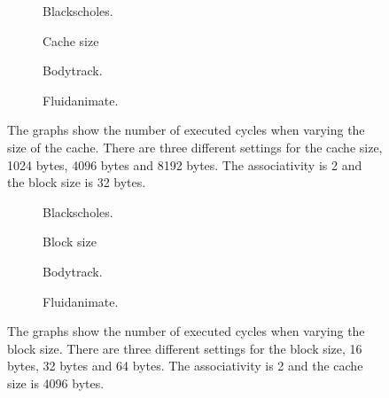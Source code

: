 \begin{figure}[H]
    \centering
    \begin{subfigure}[b]{0.33\textwidth}
        \centering
        \caption{Blackscholes.}\label{fig:cache_size_blackscholes_advanced}
    \end{subfigure}%
    \hfill
    \begin{subfigure}[b]{0.33\textwidth}
        \centering
        Cache size\par\medskip
        \caption{Bodytrack.}\label{fig:cache_size_bodytrack_advanced}
    \end{subfigure}%
    \hfill
    \begin{subfigure}[b]{0.33\textwidth}
        \centering
        \caption{Fluidanimate.}\label{fig:cache_size_fluidanimate_advanced}
    \end{subfigure}
    \hfill
    \caption{The graphs show the number of executed cycles when varying the size of the cache. There are three different settings for the cache size, 1024 bytes, 4096 bytes and 8192 bytes. The associativity is 2 and the block size is 32 bytes.}\label{fig:cache_size_advanced}
\end{figure}

\begin{figure}[H]
    \centering
    \begin{subfigure}[b]{0.33\textwidth}
        \centering
        \caption{Blackscholes.}\label{fig:block_size_blackscholes_advanced}
    \end{subfigure}%
    \hfill
    \begin{subfigure}[b]{0.33\textwidth}
        \centering
        Block size\par\medskip
        \caption{Bodytrack.}\label{fig:block_size_bodytrack_advanced}
    \end{subfigure}%
    \hfill
    \begin{subfigure}[b]{0.33\textwidth}
        \centering
        \caption{Fluidanimate.}\label{fig:block_size_fluidanimate_advanced}
    \end{subfigure}
    \hfill
    \caption{The graphs show the number of executed cycles when varying the block size. There are three different settings for the block size, 16 bytes, 32 bytes and 64 bytes. The associativity is 2 and the cache size is 4096 bytes.}\label{fig:block_size_advanced}
\end{figure}

